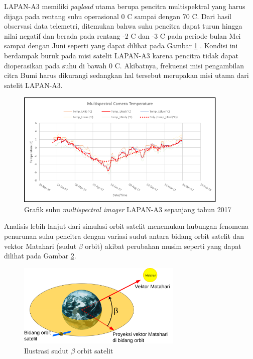 LAPAN-A3 memiliki \textit{payload} utama berupa pencitra multispektral yang
harus dijaga pada rentang suhu operasional 0 \degree C sampai dengan 70 \degree
C. Dari hasil observasi data telemetri, ditemukan bahwa suhu pencitra dapat
turun hingga nilai negatif dan berada pada rentang -2 \degree C dan -3 \degree
C pada periode bulan Mei sampai dengan Juni seperti yang dapat dilihat pada
Gambar \ref{fig:multispectralimager} \cite{ribah2019}. Kondisi ini berdampak
buruk pada misi satelit LAPAN-A3 karena pencitra tidak dapat dioperasikan pada
suhu di bawah 0 \degree C. Akibatnya, frekuensi misi pengambilan citra Bumi
harus dikurangi sedangkan hal tersebut merupakan misi utama dari satelit LAPAN-A3.

\begin{figure}[H]
\setlength{}
\begin{center}
\includegraphics[width=0.9\textwidth]{fig/multispectralimager.png}
	\caption[Grafik suhu \textit{multispectral imager} LAPAN-A3 sepanjang tahun 2017]{Grafik suhu \textit{multispectral imager} LAPAN-A3 sepanjang tahun 2017~\cite{ribah2019}}
\label{fig:multispectralimager}
\end{center}
\end{figure}

Analisis lebih lanjut dari simulasi orbit satelit menemukan hubungan fenomena
penurunan suhu pencitra dengan variasi sudut antara bidang orbit satelit dan
vektor Matahari (sudut $\beta$ orbit) akibat perubahan musim seperti yang dapat dilihat pada Gambar \ref{fig:betaorbit}.

\begin{figure}[H]
\setlength{}
\begin{center}
\includegraphics[width=0.7\textwidth]{fig/betaorbit.png}
	\caption[Ilustrasi sudut $\beta$ orbit satelit]{Ilustrasi sudut $\beta$ orbit satelit~\cite{2012a}}
\label{fig:betaorbit}
\end{center}
\end{figure}

